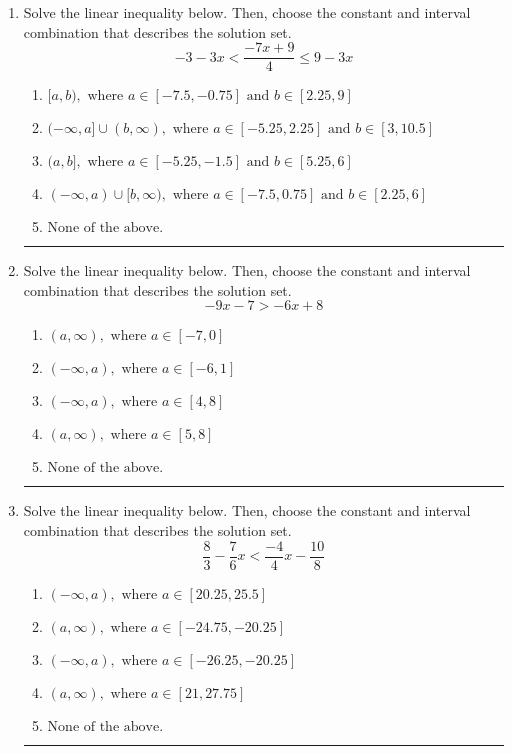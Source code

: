 \documentclass[14pt]{extbook}
\newcommand{\litem}[1]{\item#1\hspace*{-1cm}\rule{\textwidth}{0.4pt}}
\begin{document}
\begin{enumerate}
{\begin{enumerate}[label=\Alph*.]
\end{enumerate} }
\litem{
Solve the linear inequality below. Then, choose the constant and interval combination that describes the solution set.\[ -3 - 3 x < \frac{-7 x + 9}{4} \leq 9 - 3 x \]\begin{enumerate}[label=\Alph*.]
\item \( [a, b), \text{ where } a \in [-7.5, -0.75] \text{ and } b \in [2.25, 9] \)
\item \( (-\infty, a] \cup (b, \infty), \text{ where } a \in [-5.25, 2.25] \text{ and } b \in [3, 10.5] \)
\item \( (a, b], \text{ where } a \in [-5.25, -1.5] \text{ and } b \in [5.25, 6] \)
\item \( (-\infty, a) \cup [b, \infty), \text{ where } a \in [-7.5, 0.75] \text{ and } b \in [2.25, 6] \)
\item \( \text{None of the above.} \)

\end{enumerate} }
\litem{
Solve the linear inequality below. Then, choose the constant and interval combination that describes the solution set.\[ -9x -7 > -6x + 8 \]\begin{enumerate}[label=\Alph*.]
\item \( (a, \infty), \text{ where } a \in [-7, 0] \)
\item \( (-\infty, a), \text{ where } a \in [-6, 1] \)
\item \( (-\infty, a), \text{ where } a \in [4, 8] \)
\item \( (a, \infty), \text{ where } a \in [5, 8] \)
\item \( \text{None of the above}. \)

\end{enumerate} }
\litem{
Solve the linear inequality below. Then, choose the constant and interval combination that describes the solution set.\[ \frac{8}{3} - \frac{7}{6} x < \frac{-4}{4} x - \frac{10}{8} \]\begin{enumerate}[label=\Alph*.]
\item \( (-\infty, a), \text{ where } a \in [20.25, 25.5] \)
\item \( (a, \infty), \text{ where } a \in [-24.75, -20.25] \)
\item \( (-\infty, a), \text{ where } a \in [-26.25, -20.25] \)
\item \( (a, \infty), \text{ where } a \in [21, 27.75] \)
\item \( \text{None of the above}. \)

\end{enumerate} }
\end{enumerate}
\end{document}
